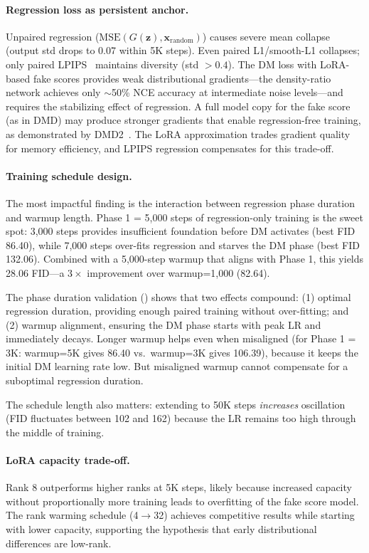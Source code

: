 \documentclass{article}
\theoremstyle{plain}
\theoremstyle{remark}
\newcommand{\bx}{\mathbf{x}}
\newcommand{\bz}{\mathbf{z}}
\begin{document}
\paragraph{Regression loss as persistent anchor.}
Unpaired regression ($\text{MSE}(G(\bz), \bx_{\text{random}})$) causes severe mean collapse (output std drops to 0.07 within 5K steps). Even paired L1/smooth-L1 collapses; only paired LPIPS~\citep{zhang2018unreasonable} maintains diversity (std $> 0.4$). The DM loss with LoRA-based fake scores provides weak distributional gradients---the density-ratio network achieves only $\sim$50\% NCE accuracy at intermediate noise levels---and requires the stabilizing effect of regression. A full model copy for the fake score (as in DMD) may produce stronger gradients that enable regression-free training, as demonstrated by DMD2~\citep{yin2024dmd2}. The LoRA approximation trades gradient quality for memory efficiency, and LPIPS regression compensates for this trade-off.

\paragraph{Training schedule design.}
The most impactful finding is the interaction between regression phase duration and warmup length. Phase 1 = 5,000 steps of regression-only training is the sweet spot: 3,000 steps provides insufficient foundation before DM activates (best FID 86.40), while 7,000 steps over-fits regression and starves the DM phase (best FID 132.06). Combined with a 5,000-step warmup that aligns with Phase 1, this yields 28.06 FID---a $3{\times}$ improvement over warmup=1,000 (82.64).

The phase duration validation () shows that two effects compound: (1) optimal regression duration, providing enough paired training without over-fitting; and (2) warmup alignment, ensuring the DM phase starts with peak LR and immediately decays. Longer warmup helps even when misaligned (for Phase 1 = 3K: warmup=5K gives 86.40 vs.\ warmup=3K gives 106.39), because it keeps the initial DM learning rate low. But misaligned warmup cannot compensate for a suboptimal regression duration.

The schedule length also matters: extending to 50K steps \emph{increases} oscillation (FID fluctuates between 102 and 162) because the LR remains too high through the middle of training.

\paragraph{LoRA capacity trade-off.}
Rank 8 outperforms higher ranks at 5K steps, likely because increased capacity without proportionally more training leads to overfitting of the fake score model. The rank warming schedule (4$\to$32) achieves competitive results while starting with lower capacity, supporting the hypothesis that early distributional differences are low-rank.
\end{document}

